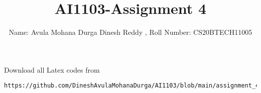 \documentclass[journal,12pt,twocolumn]{IEEEtran}
\DeclareMathOperator*{\Res}{Res}
\begin{document}
\newcommand{\BEQA}{\begin{eqnarray}}
\newcommand{\EEQA}{\end{eqnarray}}
\newcommand{\define}{\stackrel{\triangle}{=}}
\newcommand{\R}{\mathbb{R}}

\raggedbottom
\setlength{\parindent}{0pt}
\providecommand{\mbf}{\mathbf}
\providecommand{\pr}[1]{\ensuremath{\Pr\left(#1\right)}}
\providecommand{\qfunc}[1]{\ensuremath{Q\left(#1\right)}}
\providecommand{\sbrak}[1]{\ensuremath{{}\left[#1\right]}}
\providecommand{\lsbrak}[1]{\ensuremath{{}\left[#1\right.}}
\providecommand{\rsbrak}[1]{\ensuremath{{}\left.#1\right]}}
\providecommand{\brak}[1]{\ensuremath{\left(#1\right)}}
\providecommand{\lbrak}[1]{\ensuremath{\left(#1\right.}}
\providecommand{\rbrak}[1]{\ensuremath{\left.#1\right)}}
\providecommand{\cbrak}[1]{\ensuremath{\left\{#1\right\}}}
\providecommand{\lcbrak}[1]{\ensuremath{\left\{#1\right.}}
\providecommand{\rcbrak}[1]{\ensuremath{\left.#1\right\}}}
\theoremstyle{remark}
\newtheorem{rem}{Remark}
\newcommand{\sgn}{\mathop{\mathrm{sgn}}}
\providecommand{\abs}[1]{\vert#1\vert}
\providecommand{\res}[1]{\Res\displaylimits_{#1}} 
\providecommand{\norm}[1]{\lVert#1\rVert}
\providecommand{\mtx}[1]{\mathbf{#1}}
\providecommand{\mean}[1]{E[ #1 ]}
\providecommand{\fourier}{\overset{\mathcal{F}}{ \rightleftharpoons}}
\providecommand{\system}{\overset{\mathcal{H}}{ \longleftrightarrow}}
\newcommand{\solution}{\noindent \textbf{Solution: }}
\newcommand{\cosec}{\,\text{cosec}\,}
\providecommand{\dec}[2]{\ensuremath{\overset{#1}{\underset{#2}{\gtrless}}}}
\newcommand{\myvec}[1]{\ensuremath{\begin{pmatrix}#1\end{pmatrix}}}
\newcommand{\mydet}[1]{\ensuremath{\begin{vmatrix}#1\end{vmatrix}}}
\makeatletter
{}
\makeatother
\let\StandardTheFigure\thefigure
\let\vec\mathbf
\renewcommand{\thefigure}{\theproblem}
\def\putbox#1#2#3{\makebox[0in][l]{\makebox[#1][l]{}\raisebox{\baselineskip}[0in][0in]{\raisebox{#2}[0in][0in]{#3}}}}
     \def\rightbox#1{\makebox[0in][r]{#1}}
     \def\centbox#1{\makebox[0in]{#1}}
     \def\topbox#1{\raisebox{-\baselineskip}[0in][0in]{#1}}
     \def\midbox#1{\raisebox{-0.5\baselineskip}[0in][0in]{#1}}
\vspace{3cm}
\title{AI1103-Assignment 4}
\author{Name: Avula Mohana Durga Dinesh Reddy , Roll Number: CS20BTECH11005}
\maketitle
\newpage
\bigskip
\renewcommand{\thefigure}{\theenumi}
\renewcommand{\thetable}{\theenumi}
Download all Latex codes from 
%
\begin{lstlisting}
https://github.com/DineshAvulaMohanaDurga/AI1103/blob/main/assignment_4/main.tex
\end{lstlisting}
\end{document}
